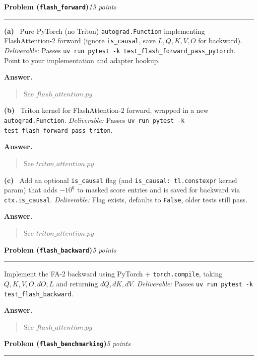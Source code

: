\documentclass[11pt]{article}
\newcommand{\problem}[2]{%
  \vspace{0.6em}%
  \noindent\textbf{Problem (\texttt{#1})}\hfill\textit{#2 points}\par%
  \vspace{0.2em}\hrule\vspace{0.4em}%
}
\newcommand{\subq}[1]{\vspace{0.3em}\noindent\textbf{(#1)}\ }
\newcommand{\deliverable}[1]{\vspace{0.2em}\noindent\textit{Deliverable:} #1\par}
\newenvironment{answer}{%
  \vspace{0.3em}%
  \noindent\textbf{Answer.}\begin{quote}%
}{%
  \end{quote}\vspace{0.4em}%
}
\begin{document}
\problem{flash\_forward}{15}

\subq{a} Pure PyTorch (no Triton) \texttt{autograd.Function} implementing FlashAttention-2 forward (ignore \texttt{is\_causal}, save $L, Q, K, V, O$ for backward).
\deliverable{Passes \texttt{uv run pytest -k test\_flash\_forward\_pass\_pytorch}. Point to your implementation and adapter hookup.}
\begin{answer}
  See $flash\_attention.py$
\end{answer}

\subq{b} Triton kernel for FlashAttention-2 forward, wrapped in a new \texttt{autograd.Function}.
\deliverable{Passes \texttt{uv run pytest -k test\_flash\_forward\_pass\_triton}.}
\begin{answer}
  See $triton\_attention.py$
\end{answer}

\subq{c} Add an optional \texttt{is\_causal} flag (and \texttt{is\_causal: tl.constexpr} kernel param) that adds $-10^6$ to masked score entries and is saved for backward via \texttt{ctx.is\_causal}.
\deliverable{Flag exists, defaults to \texttt{False}, older tests still pass.}
\begin{answer}
  See $triton\_attention.py$
\end{answer}


\problem{flash\_backward}{5}
Implement the FA-2 backward using PyTorch + \texttt{torch.compile}, taking $Q, K, V, O, dO, L$ and returning $dQ, dK, dV$.
\deliverable{Passes \texttt{uv run pytest -k test\_flash\_backward}.}
\begin{answer}
  See $flash\_attention.py$
\end{answer}


\problem{flash\_benchmarking}{5}
\end{document}
